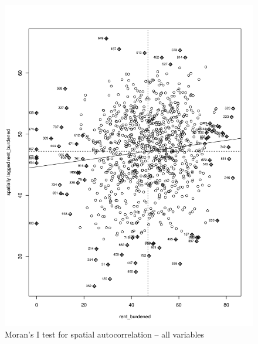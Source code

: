 \documentclass[10pt, letterpaper]{amsart}
\begin{document}
\begin{figure}[!htbp]
  \caption{Moran's I test for spatial autocorrelation -- all variables}
  \includegraphics[scale=0.09]{Moran_spatial_autocorrelation_all}
\end{figure}
\end{document}
